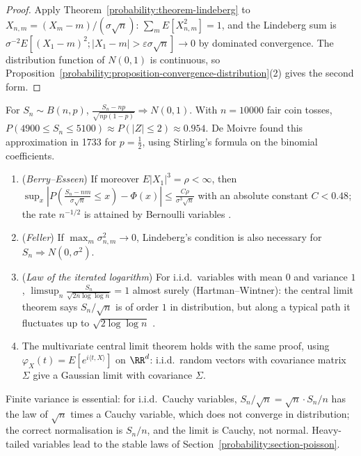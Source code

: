 \begin{proof}
Apply Theorem~\ref{probability:theorem-lindeberg} to $X_{n,m} = (X_m - m)/(\sigma\sqrt n)$: $\sum_mE[X_{n,m}^2] = 1$, and the Lindeberg sum is $\sigma^{-2}E[(X_1 - m)^2; |X_1 - m| > \varepsilon\sigma\sqrt n] \to 0$ by dominated
convergence. The distribution function of $N(0, 1)$ is continuous, so Proposition~\ref{probability:proposition-convergence-distribution}(2) gives the second form.
\end{proof}

\begin{example}\label{probability:example-de-moivre}
For $S_n \sim B(n, p)$, $\frac{S_n - np}{\sqrt{np(1 - p)}} \Rightarrow N(0, 1)$. With $n = 10000$ fair coin tosses, $P(4900 \leq S_n \leq 5100) \approx P(|Z| \leq 2) \approx 0.954$. De Moivre found this approximation in 1733 for
$p = \frac12$, using Stirling's formula on the binomial coefficients.
\end{example}

\begin{remark}\label{probability:remark-clt}
\begin{enumerate}
\item (\emph{Berry--Esseen}) If moreover $E|X_1|^3 = \rho < \infty$, then $\sup_x|P(\frac{S_n - nm}{\sigma\sqrt n} \leq x) - \Phi(x)| \leq \frac{C\rho}{\sigma^3\sqrt n}$ with an absolute constant $C < 0.48$; the rate $n^{-1/2}$ is attained by
Bernoulli variables \cite{durrett-probability}.
\item (\emph{Feller}) If $\max_m\sigma_{n,m}^2 \to 0$, Lindeberg's condition is also necessary for $S_n \Rightarrow N(0, \sigma^2)$.
\item (\emph{Law of the iterated logarithm}) For i.i.d.\ variables with mean $0$ and variance $1$, $\limsup_n\frac{S_n}{\sqrt{2n\log\log n}} = 1$ almost surely (Hartman--Wintner): the central limit theorem says $S_n/\sqrt n$ is of order $1$
in distribution, but along a typical path it fluctuates up to $\sqrt{2\log\log n}$ \cite{durrett-probability}.
\item The multivariate central limit theorem holds with the same proof, using $\varphi_X(t) = E[e^{i\langle t, X\rangle}]$ on $\RR^d$: i.i.d.\ random vectors with covariance matrix $\Sigma$ give a Gaussian limit with covariance $\Sigma$.
\end{enumerate}
\end{remark}

\begin{counterexample}\label{probability:counterexample-clt}
Finite variance is essential: for i.i.d.\ Cauchy variables, $S_n/\sqrt n = \sqrt n\cdot S_n/n$ has the law of $\sqrt n$ times a Cauchy variable, which does not converge in distribution; the correct normalisation is $S_n/n$, and the
limit is Cauchy, not normal. Heavy-tailed variables lead to the stable laws of Section~\ref{probability:section-poisson}.
\end{counterexample}


